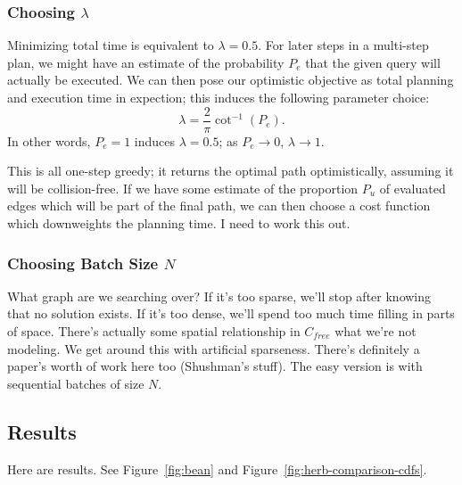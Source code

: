 \documentclass{article}
\begin{document}
\subsubsection{Choosing $\lambda$}

Minimizing total time is equivalent to $\lambda = 0.5$.
For later steps in a multi-step plan,
we might have an estimate of the probability $P_e$ that the given query will
actually be executed.
We can then pose our optimistic objective as total planning and execution
time in expection;
this induces the following parameter choice:
\begin{equation}
   \lambda = \textstyle \frac{2}{\pi} \cot^{-1} (P_e) .
\end{equation}
In other words, $P_e=1$ induces $\lambda = 0.5$;
as $P_e \rightarrow 0$, $\lambda \rightarrow 1$.

This is all one-step greedy;
it returns the optimal path optimistically,
assuming it will be collision-free.
If we have some estimate of the proportion $P_u$ of evaluated edges
which will be part of the final path,
we can then choose a cost function which downweights the planning time.
I need to work this out. 

\subsubsection{Choosing Batch Size $N$}

What graph are we searching over?
If it's too sparse, we'll stop after knowing that no solution exists.
If it's too dense, we'll spend too much time filling in parts of
space.
There's actually some spatial relationship in $C_{free}$ what we're not
modeling.
We get around this with artificial sparseness.
There's definitely a paper's worth of work here too (Shushman's stuff).
The easy version is with sequential batches of size $N$.

\subsection{Results}

Here are results.
See Figure~\ref{fig:bean} and Figure~\ref{fig:herb-comparison-cdfs}.
\end{document}
